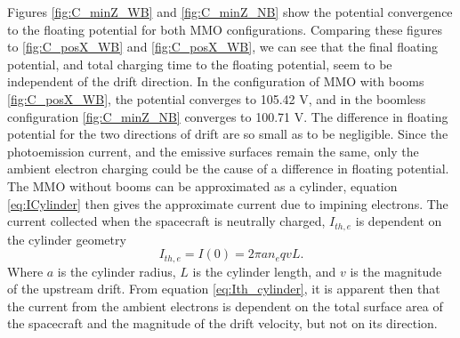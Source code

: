 Figures \ref{fig:C_minZ_WB} and \ref{fig:C_minZ_NB} show the potential convergence to the floating potential for both MMO configurations. Comparing these figures to \ref{fig:C_posX_WB} and \ref{fig:C_posX_WB}, we can see that the final floating potential, and total charging time to the floating potential, seem to be independent of the drift direction. In the configuration of MMO with booms \ref{fig:C_posX_WB}, the potential converges to 105.42 V, and in the boomless configuration \ref{fig:C_minZ_NB} converges to 100.71 V. The difference in floating potential for the two directions of drift are so small as to be negligible. Since the photoemission current, and the emissive surfaces remain the same, only the ambient electron charging could be the cause of a difference in floating potential. The MMO without booms can be approximated as a cylinder, equation \eqref{eq:ICylinder} then gives the approximate current due to impining electrons. The current collected when the spacecraft is neutrally charged, $I_{th,e}$ is dependent on the cylinder geometry \parencite{LAI2019}
\begin{equation}\label{eq:Ith_cylinder}
    I_{th,e} = I(0) = 2 \pi a n_e q v L.    
\end{equation}
Where $a$ is the cylinder radius, $L$ is the cylinder length, and $v$ is the magnitude of the upstream drift. From equation \eqref{eq:Ith_cylinder}, it is apparent then that the current from the ambient electrons is dependent on the total surface area of the spacecraft and the magnitude of the drift velocity, but not on its direction.

